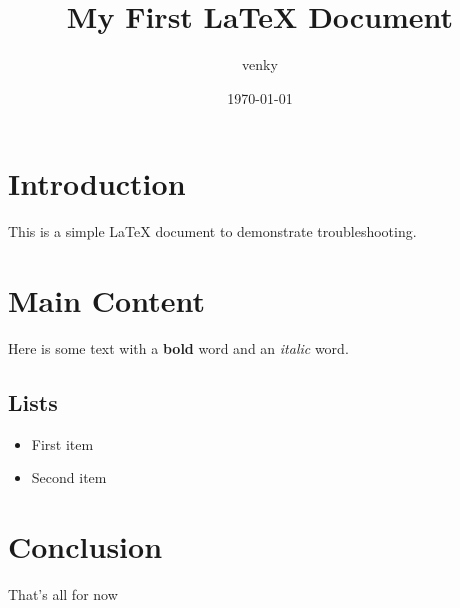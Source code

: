 \documentclass{article}
\title{My First LaTeX Document}
\author{venky}
\date{\today}
\begin{document}
	\maketitle
	\section{Introduction}
	This is a simple LaTeX document to demonstrate troubleshooting.
	\section{Main Content}
	Here is some text with a \textbf{bold} word and an \emph{italic} word.
	\subsection{Lists}
	\begin{itemize}
		\item First item
		\item Second item
	\end{itemize}
	\section{Conclusion}
	That’s all for now
\end{document}
